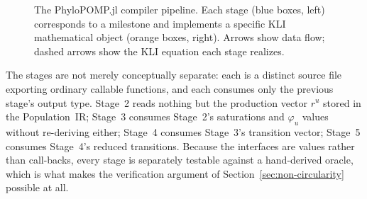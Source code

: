 \documentclass[11pt,leqno]{article}
\newcommand{\Xr}{\mathbf{X}}        %
\newcommand{\Demes}{\mathcal{D}}    %
\newcommand{\dd}[1]{\,\mathrm{d}{#1}}
\newcommand{\lik}{\mathcal{L}}      %
\theoremstyle{plain}
\theoremstyle{definition}
\begin{document}
\begin{figure}[ht]
\caption{The PhyloPOMP.jl compiler pipeline.  Each stage (blue boxes, left)
corresponds to a milestone and implements a specific KLI mathematical object
(orange boxes, right).  Arrows show data flow; dashed arrows show the KLI
equation each stage realizes.}
\label{fig:pipeline}
\end{figure}

The stages are not merely conceptually separate: each is a distinct source
file exporting ordinary callable functions, and each consumes only the
previous stage's output type.  Stage~2 reads nothing but the production
vector $r^u$ stored in the Population~IR; Stage~3 consumes Stage~2's
saturations and $\varphi_u$ values without re-deriving either; Stage~4
consumes Stage~3's transition vector; Stage~5 consumes Stage~4's reduced
transitions.  Because the interfaces are values rather than call-backs, every
stage is separately testable against a hand-derived oracle, which is what
makes the verification argument of Section~\ref{sec:non-circularity} possible at
all.
\end{document}
